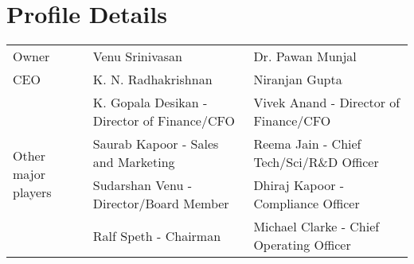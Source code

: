 \section{Profile Details}
\begin{tabular}{|p{0.2\linewidth}|p{0.4\linewidth}|p{0.4\linewidth}|}
	\hline
	Owner & Venu Srinivasan & Dr. Pawan Munjal\\
	CEO & K. N. Radhakrishnan & Niranjan Gupta\\ \hline
	\multirow{6}{*}{Other major players} & K. Gopala Desikan - Director of Finance/CFO & Vivek Anand - Director of Finance/CFO\\
	& Saurab Kapoor	- Sales and Marketing & Reema Jain - Chief Tech/Sci/R\&D Officer\\
	& Sudarshan Venu - Director/Board Member & Dhiraj Kapoor - Compliance Officer\\
	& Ralf Speth - Chairman & Michael Clarke - Chief Operating Officer\\ \hline
\end{tabular}